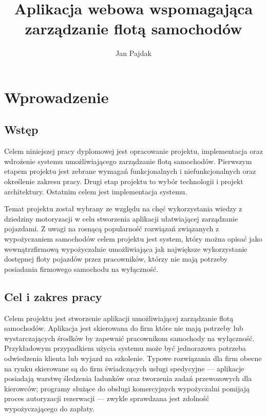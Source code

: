 \documentclass[eng,printmode,openany]{mgr}
\title{Aplikacja webowa wspomagająca zarządzanie flotą samochodów}
\author{Jan Pajdak}
\begin{document}
	 
	
	\maketitle
	
	\tableofcontents 
	
	
	\chapter{Wprowadzenie}
	\section{Wstęp}
	Celem niniejszej pracy dyplomowej jest opracowanie projektu, implementacja oraz wdrożenie systemu umożliwiającego zarządzanie flotą samochodów. Pierwszym etapem projektu jest zebrane wymagań funkcjonalnych i niefunkcjonalnych oraz określenie zakresu pracy. Drugi etap projektu to wybór technologii i projekt architektury. Ostatnim celem jest implementacja systemu.
	
	Temat projektu został wybrany ze względu na chęć wykorzystania wiedzy z dziedziny motoryzacji w celu stworzenia aplikacji ułatwiającej zarządzanie pojazdami. Z uwagi na rosnącą popularność rozwiązań związanych z wypożyczaniem samochodów celem projektu jest system, który można opisać jako wewnątrzfirmową wypożyczalnie umożliwiająca jak największe wykorzystanie dostępnej floty pojazdów przez pracowników, którzy nie mają potrzeby posiadania firmowego samochodu na wyłączność. 
	
	\section{Cel i zakres pracy}
	Celem projektu jest stworzenie aplikacji umożliwiającej zarządzanie flotą samochodów. Aplikacja jest skierowana do firm które nie mają potrzeby lub wystarczających środków by zapewnić pracownikom samochody na wyłączność. Przykładowym przypadkiem użycia systemu może być jednorazowa potrzeba odwiedzenia klienta lub wyjazd na szkolenie. Typowe rozwiązania dla firm obecne na rynku skierowane są do firm świadczących usługi spedycyjne — aplikacje posiadają warstwę śledzenia ładunków oraz tworzenia zadań przewozowych dla kierowców; programy służące do obsługi komercyjnych wypożyczalni pomijają proces autoryzacji rezerwacji — zwykle sprawdzana jest zdolność wypożyczającego do zapłaty.
	
\end{document}
